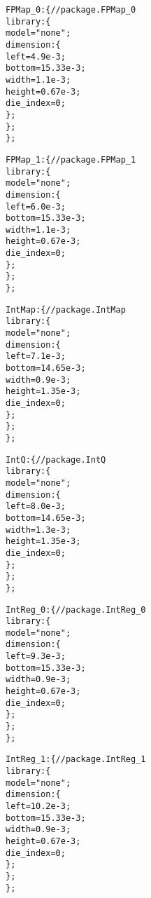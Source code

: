 {\begin{alltt}
            FPMap\_0: \{ // package.FPMap\_0
                library: \{
                    model = "none";
                    dimension: \{
                        left = 4.9e-3;
                        bottom = 15.33e-3;
                        width = 1.1e-3;
                        height = 0.67e-3;
                        die_index = 0;
                    \};
                \};
            \};

            FPMap\_1: \{ // package.FPMap\_1
                library: \{
                    model = "none";
                    dimension: \{
                        left = 6.0e-3;
                        bottom = 15.33e-3;
                        width = 1.1e-3;
                        height = 0.67e-3;
                        die_index = 0;
                    \};
                \};
            \};

            IntMap: \{ // package.IntMap
                library: \{
                    model = "none";
                    dimension: \{
                        left = 7.1e-3;
                        bottom = 14.65e-3;
                        width = 0.9e-3;
                        height = 1.35e-3;
                        die_index = 0;
                    \};
                \};
            \};
            
            IntQ: \{ // package.IntQ
                library: \{
                    model = "none";
                    dimension: \{
                        left = 8.0e-3;
                        bottom = 14.65e-3;
                        width = 1.3e-3;
                        height = 1.35e-3;
                        die_index = 0;
                    \};
                \};
            \};

            IntReg\_0: \{ // package.IntReg\_0
                library: \{
                    model = "none";
                    dimension: \{
                        left = 9.3e-3;
                        bottom = 15.33e-3;
                        width = 0.9e-3;
                        height = 0.67e-3;
                        die_index = 0;
                    \};
                \};
            \};

            IntReg\_1: \{ // package.IntReg\_1
                library: \{
                    model = "none";
                    dimension: \{
                        left = 10.2e-3;
                        bottom = 15.33e-3;
                        width = 0.9e-3;
                        height = 0.67e-3;
                        die_index = 0;
                    \};
                \};
            \};
            

\end{alltt}}
